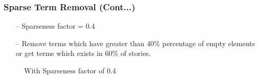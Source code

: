 \documentclass{beamer}
\begin{document}
\begin{frame}[noframenumbering]
\frametitle{Sparse Term Removal (Cont...)}
\begin{itemize}
\item[--] Sparseness factor = 0.4
\item[--] Remove terms which have greater than 40\% percentage of empty elements or get terms which exists in 60\% of stories.
\end{itemize}
\begin{figure}[h] 
\centering
{}
\centering
\caption{With Sparseness factor of 0.4}
\label{DTM}
\end{figure}
\end{frame}
\end{document}
